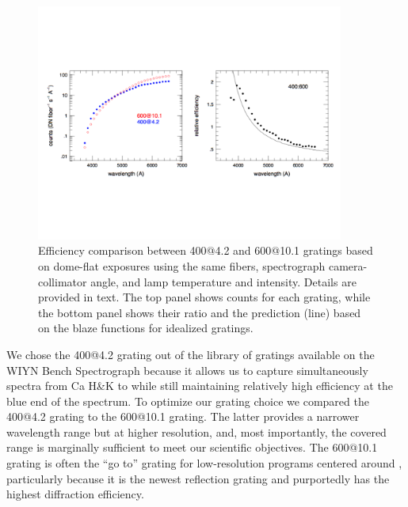 \begin{appendices}
\begin{figure}[htb]
\centering
\vskip -1.25in
  \includegraphics[width=0.9\textwidth]{891_1/figs/blaze_comp_land.pdf}
\vskip -1.25in
\caption{\label{fig:grating_comp}\fixspacing Efficiency comparison
  between 400@4.2 and 600@10.1 gratings based on dome-flat exposures
  using the same fibers, spectrograph camera-collimator angle, and
  lamp temperature and intensity. Details are provided in text. The
  top panel shows counts for each grating, while the bottom panel
  shows their ratio and the prediction (line) based on the blaze
  functions for idealized gratings.}
\end{figure}




We chose the 400@4.2 grating out of the library of gratings available
on the WIYN Bench Spectrograph because it allows us to capture
simultaneously spectra from Ca H\&K to \Ha while still maintaining
relatively high efficiency at the blue end of the spectrum.  To
optimize our grating choice we compared the 400@4.2 grating to the
600@10.1 grating. The latter provides a narrower wavelength range but
at higher resolution, and, most importantly, the covered range is
marginally sufficient to meet our scientific objectives.  The 600@10.1
grating is often the ``go to'' grating for low-resolution programs
centered around , particularly because it is the newest
reflection grating and purportedly has the highest diffraction
efficiency.


\end{appendices}
